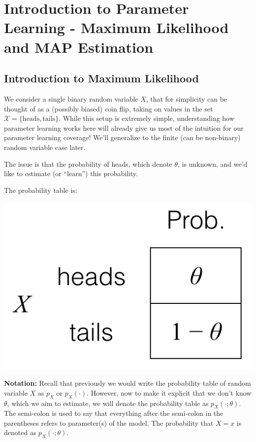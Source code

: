 \documentclass[6008notes.tex]{subfiles}
\begin{document}
\graphicspath{ {images/intropl/} }

\section{Introduction to Parameter Learning - Maximum Likelihood and MAP Estimation }

\subsection{Introduction to Maximum Likelihood}

We consider a single binary random variable $X$, that for simplicity can be thought of as a (possibly biased) coin flip, taking on values in the set $\mathcal{X}=\{ \text {heads},\text {tails}\}$. While this setup is extremely simple, understanding how parameter learning works here will already give us most of the intuition for our parameter learning coverage! We'll generalize to the finite (can be non-binary) random variable case later.

The issue is that the probability of heads, which denote $\theta$, is unknown, and we'd like to estimate (or ``learn'') this probability.

The probability table is:

{\centering\includegraphics[scale=0.4]{images_sec-maximum-likelihood-intro} \par}

\textbf{Notation:} Recall that previously we would write the probability table of random variable $X$ as $p_X$ or $p_X(\cdot)$. However, now to make it explicit that we don't know $\theta$, which we aim to estimate, we will denote the probability table as $p_{X}(\cdot ;\theta )$. The semi-colon is used to say that everything after the semi-colon in the parentheses refers to parameter(s) of the model. The probability that $X=x$ is denoted as $p_{X}(\cdot ;\theta )$.
\end{document}
